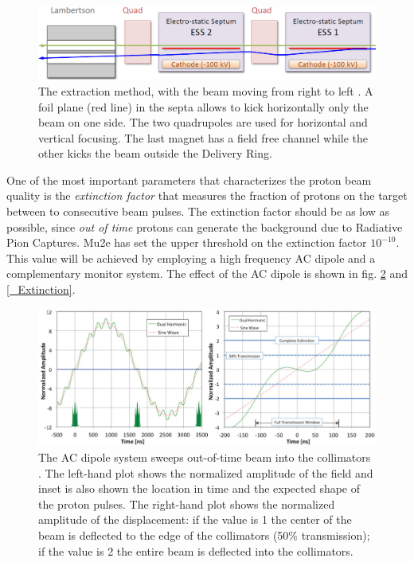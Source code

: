 \documentclass[12pt,a4paper,openright, oneside, titlepage]{book} %
\begin{document}
\begin{figure}[h!]
\centering
\includegraphics[scale=0.7]{Extraction}
\caption[Resonant extraction]{The extraction method, with the beam moving from right to left \cite{Extraction}. A foil plane (red line) in the septa allows to kick horizontally only the beam on one side. The two quadrupoles are used for horizontal and vertical focusing. The last magnet has a field free channel while the other kicks the beam outside the Delivery Ring.}
\label{_Extraction}
\end{figure}

\noindent 
One of the most important parameters that characterizes the proton beam quality is the \textit{extinction factor} that measures the fraction of protons on the target between to consecutive beam pulses. 
The extinction factor should be as low as possible, since \textit{out of time} protons can generate the background due to Radiative Pion Captures. 
Mu2e has set the upper threshold on the extinction factor $10^{-10}$. 
This value will be achieved by employing a high frequency AC dipole and a complementary monitor system. The effect of the AC dipole is shown in fig. \ref{_AC_dipole} and \ref{_Extinction}.\\

\begin{figure}[h!]
\centering
\includegraphics[scale=0.5]{AC_dipole}
\caption[AC dipole extinction]{The AC dipole system sweeps out-of-time beam into the collimators \cite{bob_mu2e}. 
The left-hand plot shows the normalized amplitude of the field and inset is also shown the location in time and the expected shape of the proton pulses. 
The right-hand plot shows the normalized amplitude of the displacement: if the value is 1 the center of the beam is deflected to the edge of the collimators (50\% transmission); if the value is 2 the entire beam is deflected into the collimators.}
\label{_AC_dipole}
\end{figure}
\end{document}
